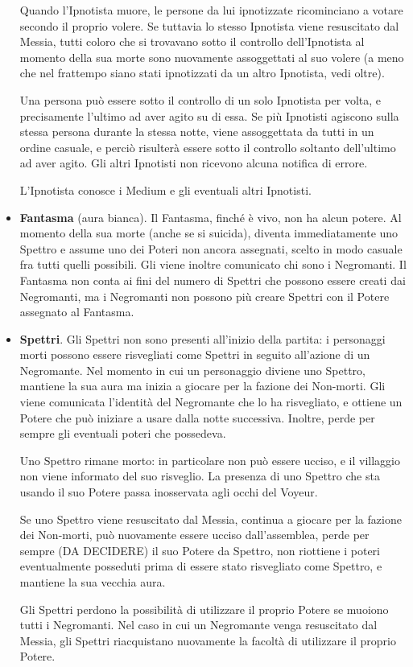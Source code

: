 \documentclass[a4paper,10pt]{article}
\begin{document}
\begin{itemize}
 Quando l'Ipnotista muore, le persone da lui ipnotizzate ricominciano a votare secondo il proprio volere. Se tuttavia lo stesso Ipnotista viene resuscitato dal Messia, tutti coloro che si trovavano sotto il controllo dell'Ipnotista al momento della sua morte sono nuovamente assoggettati al suo volere (a meno che nel frattempo siano stati ipnotizzati da un altro Ipnotista, vedi oltre).

 Una persona può essere sotto il controllo di un solo Ipnotista per volta, e precisamente l'ultimo ad aver agito su di essa. Se più Ipnotisti agiscono sulla stessa persona durante la stessa notte, viene assoggettata da tutti in un ordine casuale, e perciò risulterà essere sotto il controllo soltanto dell'ultimo ad aver agito. Gli altri Ipnotisti non ricevono alcuna notifica di errore. 

 L'Ipnotista conosce i Medium e gli eventuali altri Ipnotisti.

 \item {\bf Fantasma} (aura bianca). Il Fantasma, finché è vivo, non ha alcun potere. Al momento della sua morte (anche se si suicida), diventa immediatamente uno Spettro e assume uno dei Poteri non ancora assegnati, scelto in modo casuale fra tutti quelli possibili. Gli viene inoltre comunicato chi sono i Negromanti. Il Fantasma non conta ai fini del numero di Spettri che possono essere creati dai Negromanti, ma i Negromanti non possono più creare Spettri con il Potere assegnato al Fantasma.
 
 \item {\bf Spettri}. Gli Spettri non sono presenti all'inizio della partita: i personaggi morti possono essere risvegliati come Spettri in seguito all'azione di un Negromante.
 Nel momento in cui un personaggio diviene uno Spettro, mantiene la sua aura ma inizia a giocare per la fazione dei Non-morti. Gli viene comunicata l'identità del Negromante che lo ha risvegliato, e ottiene un Potere che può iniziare a usare dalla notte successiva. Inoltre, perde per sempre gli eventuali poteri che possedeva.
 
 Uno Spettro rimane morto: in particolare non può essere ucciso, e il villaggio non viene informato del suo risveglio.
 La presenza di uno Spettro che sta usando il suo Potere passa inosservata agli occhi del Voyeur.
 
 Se uno Spettro viene resuscitato dal Messia, continua a giocare per la fazione dei Non-morti, può nuovamente essere ucciso dall'assemblea, perde per sempre (DA DECIDERE) il suo Potere da Spettro, non riottiene i poteri eventualmente posseduti prima di essere stato risvegliato come Spettro, e mantiene la sua vecchia aura.
 
 Gli Spettri perdono la possibilità di utilizzare il proprio Potere se muoiono tutti i Negromanti. Nel caso in cui un Negromante venga resuscitato dal Messia, gli Spettri riacquistano nuovamente la facoltà di utilizzare il proprio Potere.
\end{itemize}
\end{document}
